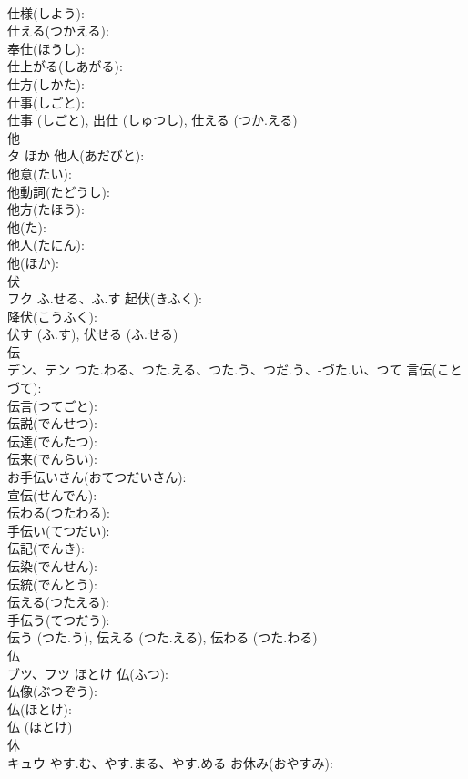 \documentclass[8pt]{extreport}
\begin{document}
\begin{CJK}{UTF8}{min}
\\	仕様(しよう): 
\\	仕える(つかえる): 
\\	奉仕(ほうし): 
\\	仕上がる(しあがる): 
\\	仕方(しかた): 
\\	仕事(しごと): 
\\	仕事 (しごと), 出仕 (しゅつし), 仕える (つか.える)
\\	他			
\\	タ	ほか	他人(あだびと): 
\\	他意(たい): 
\\	他動詞(たどうし): 
\\	他方(たほう): 
\\	他(た): 
\\	他人(たにん): 
\\	他(ほか): 
\\	伏			
\\	フク	ふ.せる、ふ.す	起伏(きふく): 
\\	降伏(こうふく): 
\\	伏す (ふ.す), 伏せる (ふ.せる)
\\	伝			
\\	デン、テン	つた.わる、つた.える、つた.う、つだ.う、-づた.い、つて	言伝(ことづて): 
\\	伝言(つてごと): 
\\	伝説(でんせつ): 
\\	伝達(でんたつ): 
\\	伝来(でんらい): 
\\	お手伝いさん(おてつだいさん): 
\\	宣伝(せんでん): 
\\	伝わる(つたわる): 
\\	手伝い(てつだい): 
\\	伝記(でんき): 
\\	伝染(でんせん): 
\\	伝統(でんとう): 
\\	伝える(つたえる): 
\\	手伝う(てつだう): 
\\	伝う (つた.う), 伝える (つた.える), 伝わる (つた.わる)
\\	仏			
\\	ブツ、フツ	ほとけ	仏(ふつ): 
\\	仏像(ぶつぞう): 
\\	仏(ほとけ): 
\\	仏 (ほとけ)
\\	休			
\\	キュウ	やす.む、やす.まる、やす.める	お休み(おやすみ): 

\end{CJK}
\end{document}
